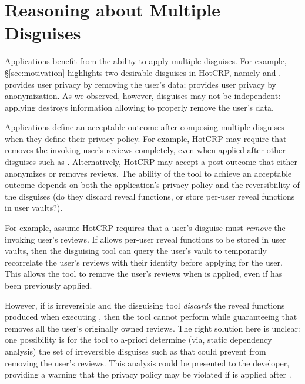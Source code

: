 \section{Reasoning about Multiple Disguises}
\label{sec:composition}

Applications benefit from the ability to apply multiple disguises. For example,
\S\ref{sec:motivation} highlights two desirable disguises in HotCRP, namely \gdpr and \ca. \gdpr
provides user privacy by removing the user's data; \ca provides user privacy by anonymization.
As we observed, however, disguises may not be independent: applying \ca destroys information allowing \gdpr to properly remove the user's data.

Applications define an acceptable outcome after composing multiple disguises when they define their
privacy policy.
For example, HotCRP may require that \gdpr removes the invoking user's reviews completely, even when
applied after other disguises such as \ca.  Alternatively, HotCRP may accept a post-\gdpr outcome that either
anonymizes or removes reviews. 
The ability of the tool to achieve an acceptable outcome depends on both the application's privacy
policy and the reversibiility of the disguises (\ie do they discard reveal functions, or store
per-user reveal functions in user vaults?).

For example, assume HotCRP requires that a user's \gdpr disguise must \emph{remove} the invoking
user's reviews. If \ca allows per-user reveal functions to be stored in user vaults, then the
disguising tool can query the user's vault to temporarily recorrelate the user's reviews with their
identity before applying \gdpr for the user.  This allows the tool to remove the user's reviews when
\gdpr is applied, even if \ca has been previously applied.
%

However, if \ca is irreversible and the disguising tool \emph{discards} the reveal functions produced when executing \ca, then the tool cannot perform \gdpr while guaranteeing that \gdpr
removes all the user's originally owned reviews.  The right solution here is unclear: one
possibility is for the tool to a-priori determine (via, \eg static dependency analysis) the set of
irreversible disguises such as \ca that could prevent \gdpr from removing the user's reviews. This
analysis could be presented to the developer, providing a warning that the privacy policy may be
violated if \gdpr is applied after \ca.

